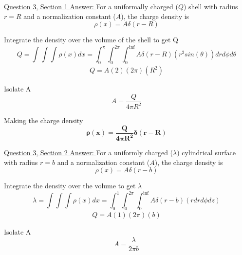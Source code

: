 \documentclass[English]{article}
\begin{document}
    \underline{Question 3, Section 1 Answer: }
    \newline \newline For a uniformally charged ($Q$) shell with radius $r=R$ and a normalization constant ($A$), the charge density is
    \begin{equation} \label{eq:3-1}
        \rho(x) = A \delta(r-R)
    \end{equation}

    Integrate the density over the volume of the shell to get Q
    \begin{equation} \label{eq:3-2}
        Q = \int \int \int \rho(x) dx = \int_0^\pi \int_0^{2 \pi} \int_0^{\inf} A \delta(r-R) (r^2 sin(\theta)) dr d\phi d\theta
    \end{equation}
    \begin{gather*}
        Q = A (2) (2 \pi) (R^2)
    \end{gather*}

    Isolate A
    \begin{equation} \label{eq:3-3}
        A = \frac{Q}{4 \pi R^2}
    \end{equation}

    Making the charge density 
    \begin{equation} \label{eq:3-4}
        \boxed{\boldsymbol{\rho(x) = \frac{Q}{4 \pi R^2} \delta(r-R)}}
    \end{equation}

    \underline{Question 3, Section 2 Answer: }
    \newline \newline For a uniformly charged ($\lambda$) cylindrical surface with radius $r=b$ and a normalization constant ($A$), the charge density is
    \begin{equation} \label{eq:3-1}
        \rho(x) = A \delta(r-b)
    \end{equation}

    Integrate the density over the volume to get $\lambda$
    \begin{equation} \label{eq:3-2}
        \lambda = \int \int \int \rho(x) dx = \int_0^1 \int_0^{2 \pi} \int_0^{\inf} A \delta(r-b) (r dr d\phi dz)
    \end{equation}
    \begin{gather*}
        Q = A (1) (2 \pi) (b)
    \end{gather*}

    Isolate A
    \begin{equation} \label{eq:3-3}
        A = \frac{\lambda}{2 \pi b}
    \end{equation}
\end{document}

